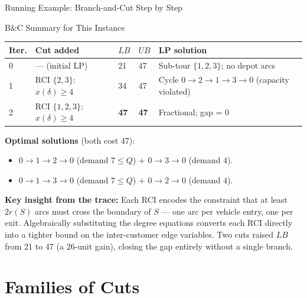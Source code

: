 \documentclass[aspectratio=169,10pt]{beamer}
\begin{document}
\begin{frame}[allowframebreaks]{Running Example: Branch-and-Cut Step by Step}
  \framebreak

  \begin{exampleblock}{B\&C Summary for This Instance}
    \begin{center}
    \begin{tabular}{lllll}
      \toprule
      Iter. & Cut added & $LB$ & $UB$ & LP solution \\
      \midrule
      0 & --- (initial LP)
        & 21 & 47 & Sub-tour $\{1,2,3\}$; no depot arcs \\
      1 & RCI $\{2,3\}$: $x(\delta)\geq 4$
        & 34 & 47 & Cycle $0\!\to\!2\!\to\!1\!\to\!3\!\to\!0$ (capacity violated) \\
      2 & RCI $\{1,2,3\}$: $x(\delta)\geq 4$
        & \textbf{47} & \textbf{47} & Fractional; gap = 0 \\
      \bottomrule
    \end{tabular}
    \end{center}

    \textbf{Optimal solutions} (both cost 47):
    \begin{itemize}
      \item $0\!\to\!1\!\to\!2\!\to\!0$ (demand $7\leq Q$) $+$
            $0\!\to\!3\!\to\!0$ (demand $4$).
      \item $0\!\to\!1\!\to\!3\!\to\!0$ (demand $7\leq Q$) $+$
            $0\!\to\!2\!\to\!0$ (demand $4$).
    \end{itemize}

    \medskip
    \textbf{Key insight from the trace:}
    Each RCI encodes the constraint that at least $2r(S)$ arcs must cross
    the boundary of $S$ --- one arc per vehicle entry, one per exit.
    Algebraically substituting the degree equations converts each RCI
    directly into a tighter bound on the inter-customer edge variables.
    Two cuts raised $LB$ from 21 to 47 (a 26-unit gain), closing the
    gap entirely without a single branch.
  \end{exampleblock}
\end{frame}

\section{Families of Cuts}
\end{document}
